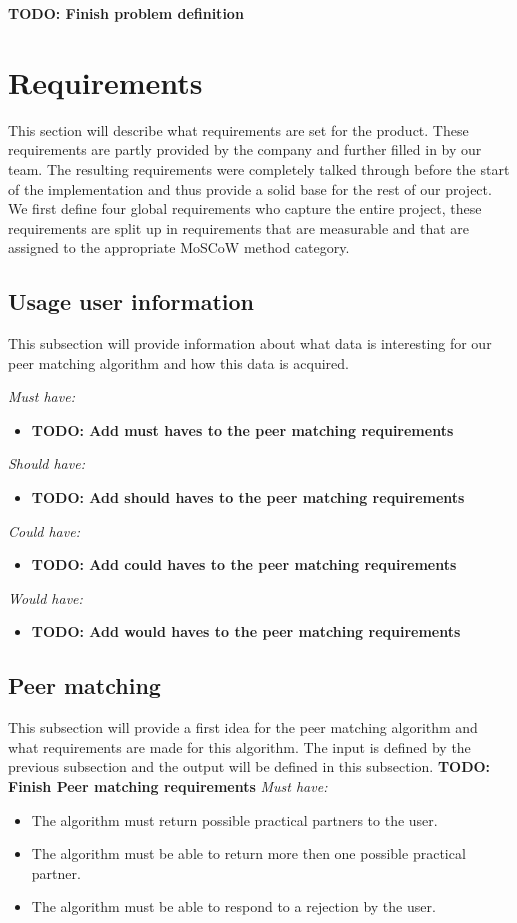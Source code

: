\documentclass[]{article}
\newcommand{\TODO}[1]{{\color{red}\textbf{TODO: #1}}}
\begin{document}
\TODO{Finish problem definition}

\section{Requirements}
This section will describe what requirements are set for the product.
These requirements are partly provided by the company and further filled in by our team.
The resulting requirements were completely talked through before the start of the implementation and thus provide a solid base for the rest of our project.
We first define four global requirements who capture the entire project, these requirements are split up in requirements that are measurable and that are assigned to the appropriate MoSCoW\cite{highsmith2001agile} method category.

\subsection{Usage user information}
This subsection will provide information about what data is interesting for our peer matching algorithm and how this data is acquired.

\emph{Must have:}
\begin{itemize}
\item \TODO{Add must haves to the peer matching requirements}
\end{itemize}

\emph{Should have:}
\begin{itemize}
\item \TODO{Add should haves to the peer matching requirements}
\end{itemize}

\emph{Could have:}
\begin{itemize}
\item \TODO{Add could haves to the peer matching requirements}
\end{itemize}

\emph{Would have:}
\begin{itemize}
\item \TODO{Add would haves to the peer matching requirements}
\end{itemize}

\subsection{Peer matching}
This subsection will provide a first idea for the peer matching algorithm and what requirements are made for this algorithm.
The input is defined by the previous subsection and the output will be defined in this subsection.
\TODO{Finish Peer matching requirements}
\emph{Must have:}
\begin{itemize}
\item The algorithm must return possible practical partners to the user.
\item The algorithm must be able to return more then one possible practical partner.
\item The algorithm must be able to respond to a rejection by the user.
\end{itemize}
\end{document}
